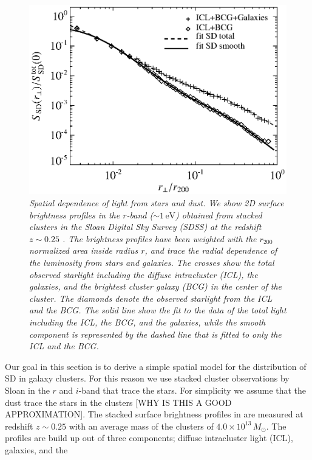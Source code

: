 \documentclass[10pt,aps,pra,reprint,amsmath,amsfonts,amssymb,showpacs]{revtex4-1}
\newcommand{\rmn}{\mathrm}
\newcommand{\msun}{M_\odot}
\newcommand{\ev}{\rmn{eV}}
\newcommand{\rvir}{r_{200}}
\begin{document}
\begin{figure}%
 \includegraphics[width=0.99\columnwidth]{figures/SB.photon.eps}
\caption{\it Spatial dependence of light from stars and dust. We show
  2D surface brightness profiles in the $r$-band ($\sim 1\,\ev$)
  obtained from stacked clusters in the Sloan Digital Sky Survey
  (SDSS) at the redshift $z \sim 0.25$ \cite{2005MNRAS.358..949Z}. The
  brightness profiles have been weighted with the $\rvir$ normalized
  area inside radius $r$, and trace the radial dependence of the
  luminosity from stars and galaxies. The crosses show the total
  observed starlight including the diffuse intracluster (ICL), the
  galaxies, and the brightest cluster galaxy (BCG) in the center of
  the cluster. The diamonds denote the observed starlight from the
  ICL and the BCG. The solid line show the fit to the data of the
  total light including the ICL, the BCG, and the galaxies, while the
  smooth component is represented by the dashed line that is fitted to
  only the ICL and the BCG.}
 \label{fig:SD_spatial}
\end{figure}
Our goal in this section is to derive a simple spatial model for the
distribution of SD in galaxy clusters. For this reason we use stacked
cluster observations by Sloan in the $r$ and $i$-band that trace the
stars. For simplicity we assume that the dust trace the stars in the
clusters [WHY IS THIS A GOOD APPROXIMATION]. The stacked surface
brightness profiles in \cite{2005MNRAS.358..949Z} are measured at
redshift $z \sim 0.25$ with an average mass of the clusters of
$4.0\times10^{13}\,\msun$. The profiles are build up out of three
components; diffuse intracluster light (ICL), galaxies, and the
\end{document}

